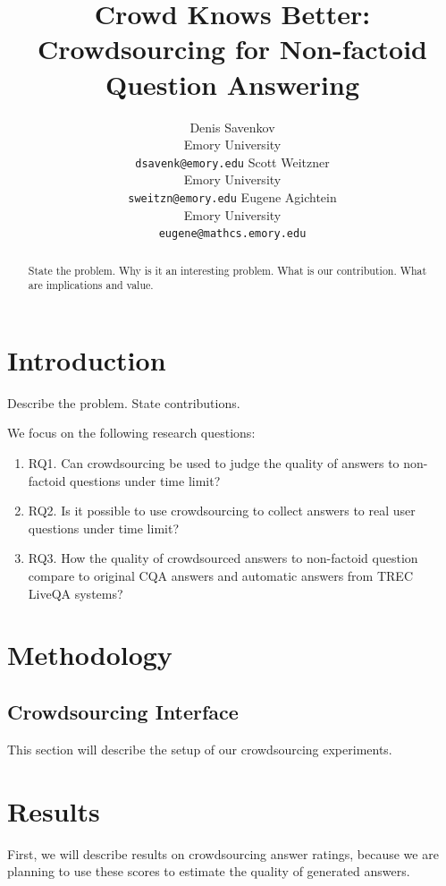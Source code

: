 \documentclass[11pt,letterpaper]{article}
\title{Crowd Knows Better: Crowdsourcing for Non-factoid Question Answering}
\author{Denis Savenkov \\ Emory University \\ {\tt dsavenk@emory.edu} 
  \And Scott Weitzner \\ Emory University \\ {\tt sweitzn@emory.edu}
  \And Eugene Agichtein \\ Emory University \\ {\tt eugene@mathcs.emory.edu}
}
\date{}
\begin{document}
\maketitle

\begin{abstract}
State the problem.
Why is it an interesting problem.
What is our contribution.
What are implications and value.
\end{abstract}

\section{Introduction}
\label{sec:introduction}

Describe the problem.
State contributions.

We focus on the following research questions:
\begin{enumerate}
\item RQ1. Can crowdsourcing be used to judge the quality of answers to non-factoid questions under time limit?
\item RQ2. Is it possible to use crowdsourcing to collect answers to real user questions under time limit?
\item RQ3. How the quality of crowdsourced answers to non-factoid question compare to original CQA answers and automatic answers from TREC LiveQA systems?
\end{enumerate}


\section{Methodology}
\label{sec:methodology}

\subsection{Crowdsourcing Interface}
\label{subsec:interface}



This section will describe the setup of our crowdsourcing experiments.




\section{Results}
\label{sec:results}

First, we will describe results on crowdsourcing answer ratings, because we are planning to use these scores to estimate the quality of generated answers.
\end{document}
